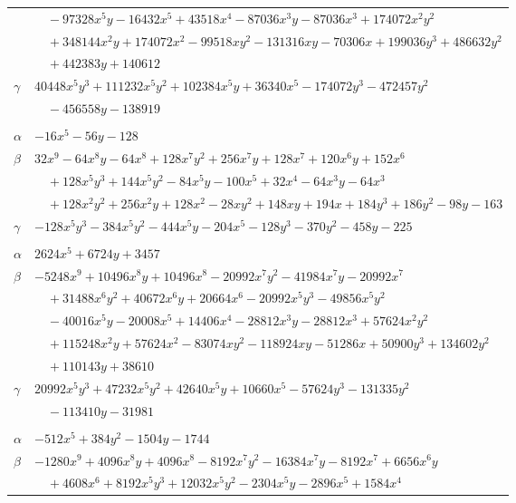 \documentclass[11pt]{article}
\begin{document}
\begin{longtable}{@{}ll@{}}
 & $\quad -97328x^{5}y-16432x^{5}+43518x^{4}-87036x^{3}y-87036x^{3}+174072x^{2}y^{2}$\\
 & $\quad +348144x^{2}y+174072x^{2}-99518xy^{2}-131316xy-70306x+199036y^{3}+486632y^{2}$\\
 & $\quad +442383y+140612$\\
$\gamma$ & $40448x^{5}y^{3}+111232x^{5}y^{2}+102384x^{5}y+36340x^{5}-174072y^{3}-472457y^{2}$\\
 & $\quad -456558y-138919$\\
\addlinespace[3pt]
\multicolumn{2}{@{}l}{$\{i,j\}=\{11,34\}$, $k_{ij}=2^{2}\cdot 3^{2}\cdot 7$}\\
$\alpha$ & $-16x^{5}-56y-128$\\
$\beta$ & $32x^{9}-64x^{8}y-64x^{8}+128x^{7}y^{2}+256x^{7}y+128x^{7}+120x^{6}y+152x^{6}$\\
 & $\quad +128x^{5}y^{3}+144x^{5}y^{2}-84x^{5}y-100x^{5}+32x^{4}-64x^{3}y-64x^{3}$\\
 & $\quad +128x^{2}y^{2}+256x^{2}y+128x^{2}-28xy^{2}+148xy+194x+184y^{3}+186y^{2}-98y-163$\\
$\gamma$ & $-128x^{5}y^{3}-384x^{5}y^{2}-444x^{5}y-204x^{5}-128y^{3}-370y^{2}-458y-225$\\
\addlinespace[3pt]
\multicolumn{2}{@{}l}{$\{i,j\}=\{11,36\}$, $k_{ij}=3^{4}\cdot 11^{2}$}\\
$\alpha$ & $2624x^{5}+6724y+3457$\\
$\beta$ & $-5248x^{9}+10496x^{8}y+10496x^{8}-20992x^{7}y^{2}-41984x^{7}y-20992x^{7}$\\
 & $\quad +31488x^{6}y^{2}+40672x^{6}y+20664x^{6}-20992x^{5}y^{3}-49856x^{5}y^{2}$\\
 & $\quad -40016x^{5}y-20008x^{5}+14406x^{4}-28812x^{3}y-28812x^{3}+57624x^{2}y^{2}$\\
 & $\quad +115248x^{2}y+57624x^{2}-83074xy^{2}-118924xy-51286x+50900y^{3}+134602y^{2}$\\
 & $\quad +110143y+38610$\\
$\gamma$ & $20992x^{5}y^{3}+47232x^{5}y^{2}+42640x^{5}y+10660x^{5}-57624y^{3}-131335y^{2}$\\
 & $\quad -113410y-31981$\\
\addlinespace[3pt]
\multicolumn{2}{@{}l}{$\{i,j\}=\{11,40\}$, $k_{ij}=3\cdot 7$}\\
$\alpha$ & $-512x^{5}+384y^{2}-1504y-1744$\\
$\beta$ & $-1280x^{9}+4096x^{8}y+4096x^{8}-8192x^{7}y^{2}-16384x^{7}y-8192x^{7}+6656x^{6}y$\\
 & $\quad +4608x^{6}+8192x^{5}y^{3}+12032x^{5}y^{2}-2304x^{5}y-2896x^{5}+1584x^{4}$\\

\end{longtable}
\end{document}
